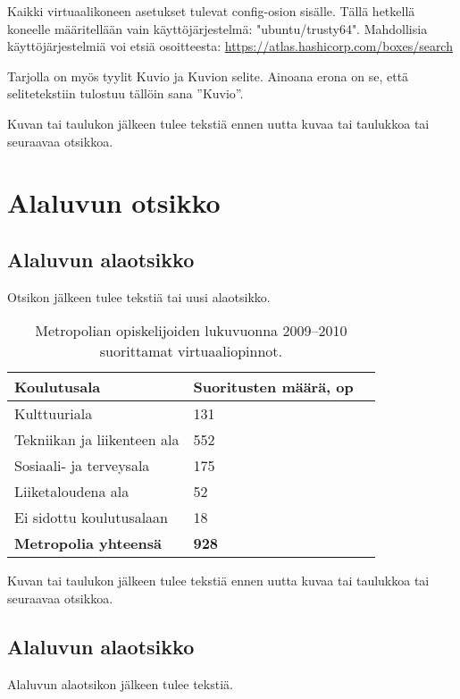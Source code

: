 Kaikki virtuaalikoneen asetukset tulevat config-osion sisälle. Tällä hetkellä koneelle määritellään vain käyttöjärjestelmä: "ubuntu/trusty64". Mahdollisia käyttöjärjestelmiä voi etsiä osoitteesta: \url{https://atlas.hashicorp.com/boxes/search}

Tarjolla on myös tyylit Kuvio ja Kuvion selite. Ainoana erona on se, että selitetekstiin tulostuu tällöin sana ”Kuvio”.

Kuvan tai taulukon jälkeen tulee tekstiä ennen uutta kuvaa tai taulukkoa tai seuraavaa otsikkoa.

\section{Alaluvun otsikko}

\subsection{Alaluvun alaotsikko}

Otsikon jälkeen tulee tekstiä tai uusi alaotsikko.

\begin{table}[h]
  \caption{Metropolian opiskelijoiden lukuvuonna 2009–2010 suorittamat virtuaaliopinnot.}
  \begin{tabular}{| l | l | l |}
  \hline
  \bfseries Koulutusala & \bfseries Suoritusten määrä, op \\
  \hline
  Kulttuuriala & 131 \\
  \hline
  Tekniikan ja liikenteen ala & 552 \\
  \hline
  Sosiaali- ja terveysala & 175 \\
  \hline
  Liiketaloudena ala & 52 \\
  \hline
  Ei sidottu koulutusalaan & 18 \\
  \hline
  \bfseries Metropolia yhteensä & \bfseries 928 \\
  \hline
  \end{tabular}
  \label{tab:virtual studies}
\end{table}

Kuvan tai taulukon jälkeen tulee tekstiä ennen uutta kuvaa tai taulukkoa tai seuraavaa otsikkoa.

\subsection{Alaluvun alaotsikko}

Alaluvun alaotsikon jälkeen tulee tekstiä.

